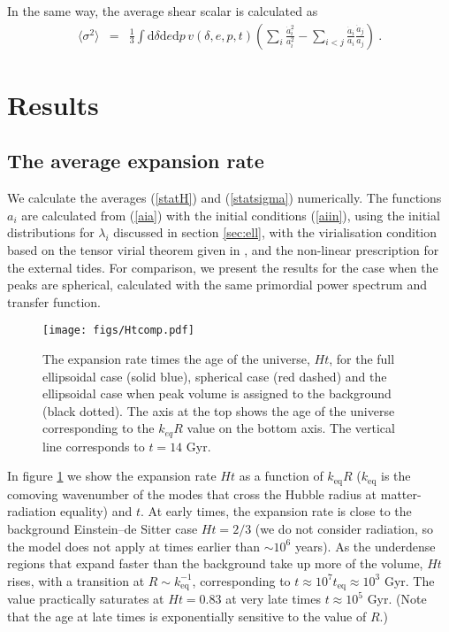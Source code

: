 \documentclass[11pt, a4paper]{article}
\newcommand{\bea}{\begin{eqnarray}} \newcommand{\eea}{\end{eqnarray}}
\newcommand{\re}[1]{(\ref{#1})}
\renewcommand{\sec}[1]{section \ref{#1}}
\newcommand{\fig}[1]{figure \ref{#1}}
\renewcommand{\d}{\delta}
\renewcommand{\l}{\lambda}
\newcommand{\keq}{k_{\mathrm{eq}}}
\newcommand{\teq}{t_{\mathrm{eq}}}
\newcommand{\rmd}{\mathrm{d}}
\newcommand{\adot}{\dot{a}}
\newcommand{\av}[1]{\langle{#1}\rangle}
\begin{document}
In the same way, the average shear scalar is calculated as
\bea \label{statsigma}
  \av{\sigma^2} &=& \frac{1}{3} \int\rmd\d\rmd e\rmd p \, v(\d,e,p,t) \left( \sum_i \frac{\adot_i^2}{a_i^2} - \sum_{i<j} \frac{\adot_i}{a_i} \frac{\adot_j}{a_j} \right) \ .
\eea

\section{Results} \label{sec:res}

\subsection{The average expansion rate}

We calculate the averages \re{statH} and \re{statsigma} numerically. The functions $a_i$ are calculated from \re{aia} with the initial conditions \re{aiin}, using the initial distributions for $\l_i$ discussed in \sec{sec:ell}, with the virialisation condition based on the tensor virial theorem given in \cite{Angrick:2010qg}, and the non-linear prescription for the external tides. For comparison, we present the results for the case when the peaks are spherical, calculated with the same primordial power spectrum and transfer function.

\begin{figure}[t]
  \centering
  \texttt{[image: figs/Htcomp.pdf]} \\
  \caption{The expansion rate times the age of the universe, $Ht$, for the full ellipsoidal case (solid blue), spherical case (red dashed) and the ellipsoidal case when peak volume is assigned to the background (black dotted). The axis at the top shows the age of the universe corresponding to the $k_{eq} R$ value on the bottom axis. The vertical line corresponds to $t=14$ Gyr.}
  \label{fig:compHt}
\end{figure}

In \fig{fig:compHt} we show the expansion rate $Ht$ as a function of
$\keq R$ ($\keq$ is the comoving wavenumber of the modes that cross
the Hubble radius at matter-radiation equality) and $t$. At early
times, the expansion rate is close to the background Einstein--de
Sitter case $Ht=2/3$ (we do not consider radiation, so the model does
not apply at times earlier than $\sim10^6$ years). As the underdense
regions that expand faster than the background take up more of the
volume, $Ht$ rises, with a transition at $R\sim\keq^{-1}$,
corresponding to $t \approx 10^7\teq\approx10^3$ Gyr. The value practically saturates at $Ht=0.83$ at very late times $t\approx 10^5$ Gyr. (Note that the age at late times is exponentially sensitive to the value of $R$.)
\end{document}
